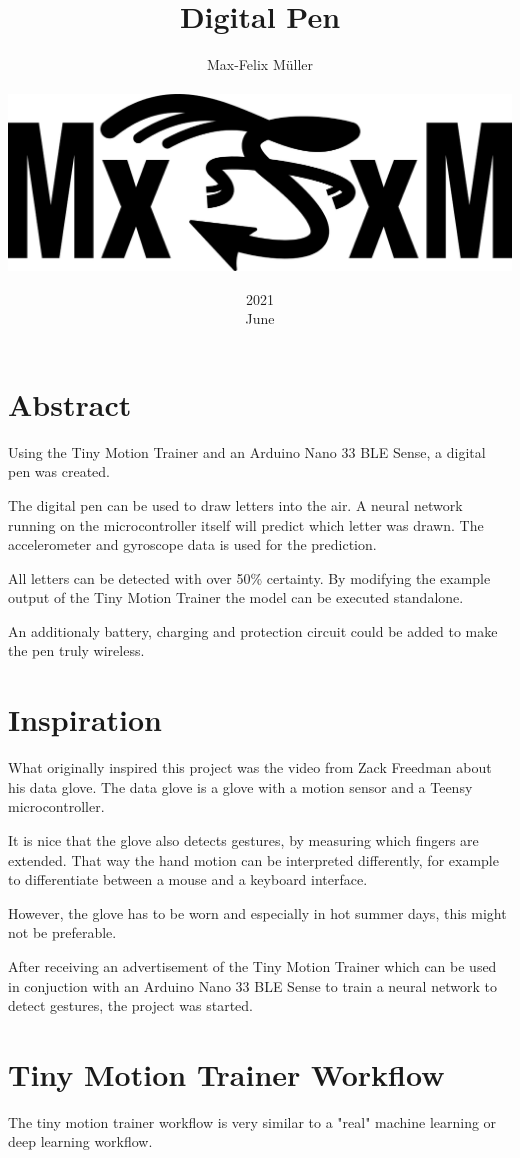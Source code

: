 \documentclass[a4paper,titlepage]{article}
\title{Digital Pen}
\date{2021\\ June}
\author{Max-Felix Müller\\ \\ \includegraphics[width=\textwidth]{mxfxm.png}}
\begin{document}
\maketitle
\tableofcontents
\newpage
\listoffigures %
\listoftables %
\newpage

\section*{Abstract}

Using the Tiny Motion Trainer and an Arduino Nano 33 BLE Sense, a digital pen was created.

The digital pen can be used to draw letters into the air.
A neural network running on the microcontroller itself will predict which letter was drawn.
The accelerometer and gyroscope data is used for the prediction.

All letters can be detected with over 50\% certainty.
By modifying the example output of the Tiny Motion Trainer the model can be executed standalone.

An additionaly battery, charging and protection circuit could be added to make the pen truly wireless.

\newpage
\section{Inspiration}

What originally inspired this project was the video from Zack Freedman about his data glove.
The data glove is a glove with a motion sensor and a Teensy microcontroller.

It is nice that the glove also detects gestures, by measuring which fingers are extended.
That way the hand motion can be interpreted differently, for example to differentiate between a mouse and a keyboard interface.

However, the glove has to be worn and especially in hot summer days, this might not be preferable.

After receiving an advertisement of the Tiny Motion Trainer which can be used in conjuction with an Arduino Nano 33 BLE Sense to train a neural network to detect gestures, the project was started.

\section{Tiny Motion Trainer Workflow}

The tiny motion trainer workflow is very similar to a "real" machine learning or deep learning workflow.
\end{document}
